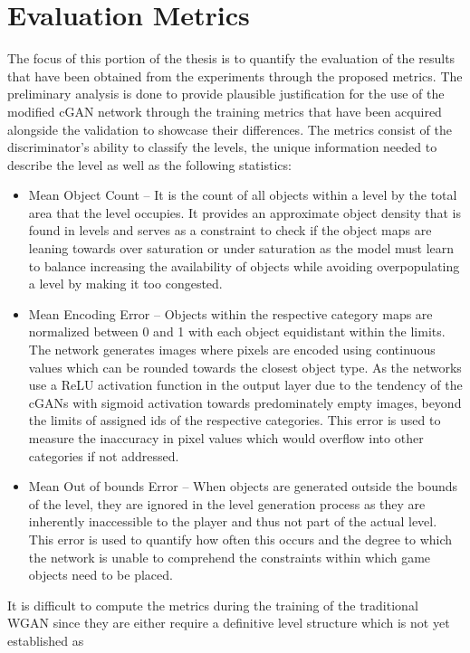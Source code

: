\documentclass{Configuration_Files/PoliMi3i_thesis}
\begin{document}
\section{Evaluation Metrics}
The focus of this portion of the thesis is to quantify the evaluation of the results that 
have been obtained from the experiments through the proposed metrics. The
preliminary analysis is done to provide plausible justification for the use of the 
modified cGAN network through the training metrics that have been acquired 
alongside the validation to showcase their differences. The metrics consist of the 
discriminator’s ability to classify the levels, the unique information needed to 
describe the level as well as the following statistics:
\begin{itemize}
\item Mean Object Count – It is the count of all objects within a level by the total 
area that the level occupies. It provides an approximate object density that is 
found in levels and serves as a constraint to check if the object maps are 
leaning towards over saturation or under saturation as the model must learn 
to balance increasing the availability of objects while avoiding overpopulating
a level by making it too congested.
\item Mean Encoding Error – Objects within the respective category maps are 
normalized between 0 and 1 with each object equidistant within the limits. 
The network generates images where pixels are encoded using continuous 
values which can be rounded towards the closest object type. As the networks 
use a ReLU activation function in the output layer due to the tendency of the 
cGANs with sigmoid activation towards predominately empty images, beyond 
the limits of assigned ids of the respective categories. This error is used to 
measure the inaccuracy in pixel values which would overflow into other 
categories if not addressed.
\item Mean Out of bounds Error – When objects are generated outside the bounds 
of the level, they are ignored in the level generation process as they are 
inherently inaccessible to the player and thus not part of the actual level. This 
error is used to quantify how often this occurs and the degree to which the 
network is unable to comprehend the constraints within which game objects 
need to be placed.
\end{itemize}
It is difficult to compute the metrics during the training of the traditional WGAN 
since they are either require a definitive level structure which is not yet established as 
\end{document}
